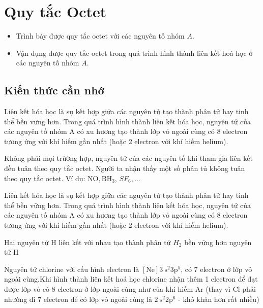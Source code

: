 \section{Quy tắc Octet}
\begin{mtbh}
	\begin{itemize}
		\item Trình bày được quy tắc octet với các nguyên tố nhóm $A$.
		\item Vận dụng được quy tắc octet trong quá trình hình thành liên kết hoá học ở các nguyên tố nhóm $A$.
	\end{itemize}
\end{mtbh}
\subsection{Kiến thức cần nhớ}
\begin{hoplythuyet}
	Liên kết hóa học là sụ kết hợp giữa các nguyên tử tạo thành phân tử hay tinh thể bền vững hơn.
	Trong quá trình hình thành liên kết hóa học, nguyên tử của các nguyên tố nhóm A có xu hương tạo thành lớp vỏ ngoài cùng có 8 electron tương ứng với khí hiếm gần nhất (hoặc 2 electron với khí hiếm helium).
\end{hoplythuyet}
\begin{notegsnd}
	Không phải mọi trừờng hợp, nguyên tử của các nguyên tố khi tham gia liên kết đều tuân theo quy tắc octet. Người ta nhận thấy một số phân tủ không tuân theo quy tắc octet. Ví dụ: $\mathrm{NO}, \mathrm{BH}_3$, $S F_6, \ldots$
\end{notegsnd}

\begin{paracol}{2}
	\begin{hoplythuyet}
		Liên kết hóa học là sụ kết hợp giữa các nguyên tử tạo thành phân tử hay tinh thể bền vững hơn.
		Trong quá trình hình thành liên kết hóa học, nguyên tử của các nguyên tố nhóm A có xu hương tạo thành lớp vỏ ngoài cùng có 8 electron tương ứng với khí hiếm gần nhất (hoặc 2 electron với khí hiếm helium).
	\end{hoplythuyet}
	\switchcolumn 
	\begin{vdnote}
		Hai nguyên tử H liên kết với nhau tạo thành phân tử $H_2$ bền vững hơn nguyên tử H
	\end{vdnote}
	\begin{vdnote}
		Nguyên tử chlorine với cấu hình electron là $[\mathrm{Ne}] 3 \mathrm{~s}^2 3 \mathrm{p}^5$, có 7 electron ở lớp vỏ ngoài cùng.Khi hình thành liên kết hoá học chlorine nhận thêm 1 electron để đạt được lớp vỏ có 8 electron ở lớp ngoài cùng như của khí hiếm $\mathrm{Ar}$ (thay vì $\mathrm{Cl}$ phải nhường đi 7 electron để có lớp vỏ ngoài cùng là $2 \mathrm{~s}^2 2 \mathrm{p}^6$ - khó khăn hơn rất nhiều)
	\end{vdnote}
\end{paracol}

